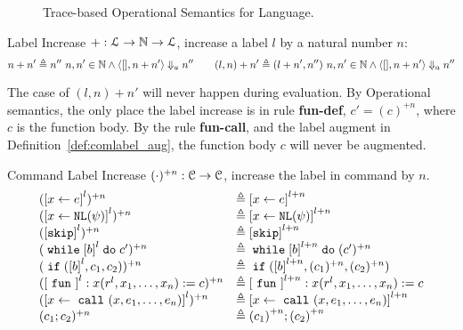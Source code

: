 {\begin{figure}
{}
    \caption{Trace-based Operational Semantics for Language.}
    \label{fig:os}
\end{figure}
%
%
  \begin{defn}
    \label{def:label_inc}  
    Label Increase $ + : {\mathcal{L} \to \mathbb{N} \to \mathcal{L}}$, increase a label $l$ by a natural number $n$:
\[
    n + n' \triangleq n'' ~ n, n' \in \mathbb{N} \land \langle [], n + n' \rangle \Downarrow_a n''
   \qquad (l, n) + n' \triangleq (l + n', n'') ~ n, n' \in \mathbb{N} \land \langle [], n + n' \rangle \Downarrow_a n''
   \]
\end{defn}
The case of $(l, n) + n'$ will never happen during evaluation.
By Operational semantics, the only place the label increase is in rule \textbf{fun-def},
$c' = (c)^{+n}$, where $c$ is the function body.
By the rule \textbf{fun-call}, and the label augment in Definition~\ref{def:comlabel_aug}, the function body $c$ will never be augmented.
%
\begin{defn} 
  \label{def:comlabel_inc}
Command Label Increase $ {(\cdot)}{}^{+n} : {\mathcal{C} \to \mathcal{C}}$, increase the label in command by $n$.
\[
\begin{array}{ll}
  (\clabel{\assign{x}{\expr}}^l){}^{+n} & \triangleq \clabel{\assign{x}{\expr}}^{l + n}\\
(\clabel{\assign{x}{\query(\qexpr)}}^l)^{+n} & \triangleq \clabel{\assign{x}{\query(\qexpr)}}^{l + n}\\
(\clabel{\eskip}^l)^{+n} & \triangleq \clabel{\eskip}^{l + n}\\
(\ewhile \clabel{\bexpr}^{l} \edo {c'})^{+n} & \triangleq \ewhile \clabel{\bexpr}^{l+n} \edo {(c')^{+n}}\\
(\eif(\clabel{\bexpr}^{l} , {c_1}, {c_2}))^{+n}  & \triangleq \eif(\clabel{\bexpr}^{l+n} , {(c_1)^{+n}}, {(c_2)^{+n}})\\
(\clabel{\efun}^l: x(r^l, x_1, \ldots, x_n) := c)^{+n} & \triangleq \clabel{\efun}^{l + n}: x(r^l, x_1, \ldots, x_n) := c \\
(\clabel{\assign{x}{\ecall(x, e_1, \ldots, e_n)}}^l)^{+n} & \triangleq \clabel{\assign{x}{\ecall(x, e_1, \ldots, e_n)}}^{l + n}\\
({c_1};{c_2})^{+n} &  \triangleq {(c_1)}^{+n};{(c_2)}^{+n}
\end{array}
\]
\end{defn}
}
